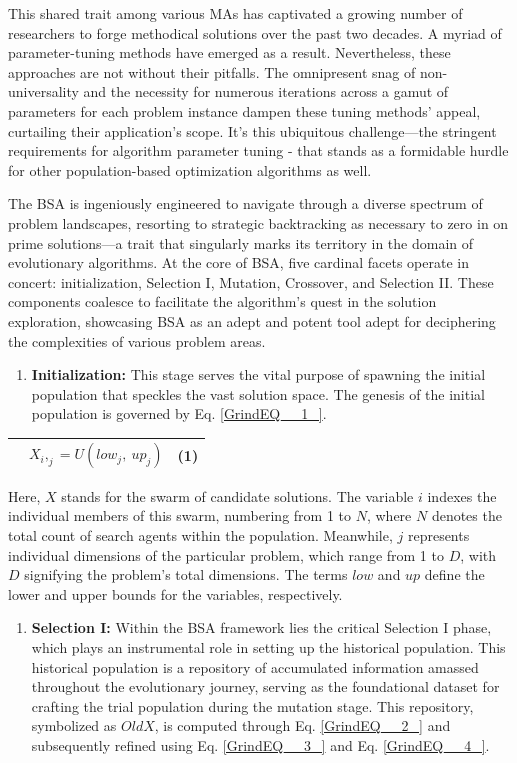 \documentclass{article} %
\begin{document}
This shared trait among various MAs has captivated a growing number of researchers to forge methodical solutions over the past two decades. A myriad of parameter-tuning methods have emerged as a result. Nevertheless, these approaches are not without their pitfalls. The omnipresent snag of non-universality and the necessity for numerous iterations across a gamut of parameters for each problem instance dampen these tuning methods' appeal, curtailing their application's scope. It's this ubiquitous challenge---the stringent requirements for algorithm parameter tuning - that stands as a formidable hurdle for other population-based optimization algorithms as well.

The BSA is ingeniously engineered to navigate through a diverse spectrum of problem landscapes, resorting to strategic backtracking as necessary to zero in on prime solutions---a trait that singularly marks its territory in the domain of evolutionary algorithms. At the core of BSA, five cardinal facets operate in concert: initialization, Selection I, Mutation, Crossover, and Selection II. These components coalesce to facilitate the algorithm's quest in the solution exploration, showcasing BSA as an adept and potent tool adept for deciphering the complexities of various problem areas.

\begin{enumerate}
\item  \textbf{Initialization:} This stage serves the vital purpose of spawning the initial population that speckles the vast solution space. The genesis of the initial population is governed by Eq. \eqref{GrindEQ__1_}.
\end{enumerate}

\begin{tabular}{|p{0.5in}|p{3.0in}|p{0.4in}|} \hline 
 & $X_i,_j=U(low_j,\ up_j)$ & (1) \\ \hline 
\end{tabular}

Here, $X$ stands for the swarm of candidate solutions. The variable $i$ indexes the individual members of this swarm, numbering from 1 to $N$, where $N$ denotes the total count of search agents within the population. Meanwhile, $j$ represents individual dimensions of the particular problem, which range from 1 to $D$, with $D$ signifying the problem's total dimensions. The terms $low$ and $up$ define the lower and upper bounds for the variables, respectively.

\begin{enumerate}
\item  \textbf{Selection I: }Within the BSA framework lies the critical Selection I phase, which plays an instrumental role in setting up the historical population. This historical population is a repository of accumulated information amassed throughout the evolutionary journey, serving as the foundational dataset for crafting the trial population during the mutation stage. This repository, symbolized as $OldX$, is computed through Eq. \eqref{GrindEQ__2_} and subsequently refined using Eq. \eqref{GrindEQ__3_} and Eq. \eqref{GrindEQ__4_}.
\end{enumerate}
\end{document}
